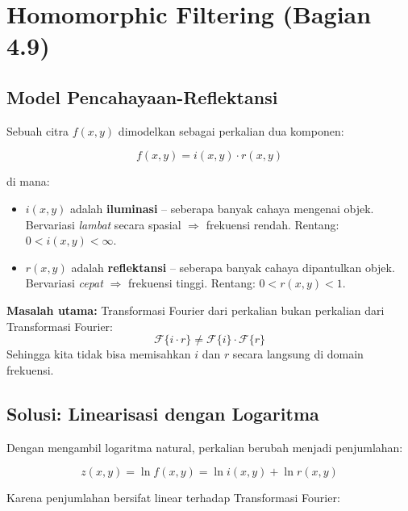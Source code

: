 \documentclass[12pt,a4paper]{article}
\begin{document}
\section{Homomorphic Filtering (Bagian 4.9)}

\subsection{Model Pencahayaan-Reflektansi}

Sebuah citra $f(x,y)$ dimodelkan sebagai perkalian dua komponen:

\begin{equation}
  f(x,y) = i(x,y) \cdot r(x,y)
  \label{eq:illumination_model}
\end{equation}

di mana:
\begin{itemize}
  \item $i(x,y)$ adalah \textbf{iluminasi} -- seberapa banyak cahaya mengenai
        objek. Bervariasi \textit{lambat} secara spasial $\Rightarrow$ frekuensi
        rendah. Rentang: $0 < i(x,y) < \infty$.
  \item $r(x,y)$ adalah \textbf{reflektansi} -- seberapa banyak cahaya
        dipantulkan objek. Bervariasi \textit{cepat} $\Rightarrow$ frekuensi
        tinggi. Rentang: $0 < r(x,y) < 1$.
\end{itemize}

\textbf{Masalah utama:} Transformasi Fourier dari perkalian bukan perkalian dari
Transformasi Fourier:
\[
  \mathcal{F}\{i \cdot r\} \neq \mathcal{F}\{i\} \cdot \mathcal{F}\{r\}
\]
Sehingga kita tidak bisa memisahkan $i$ dan $r$ secara langsung di domain
frekuensi.

\subsection{Solusi: Linearisasi dengan Logaritma}

Dengan mengambil logaritma natural, perkalian berubah menjadi penjumlahan:

\begin{equation}
  z(x,y) = \ln f(x,y) = \ln i(x,y) + \ln r(x,y)
  \label{eq:log_decomposition}
\end{equation}

Karena penjumlahan bersifat linear terhadap Transformasi Fourier:
\end{document}
